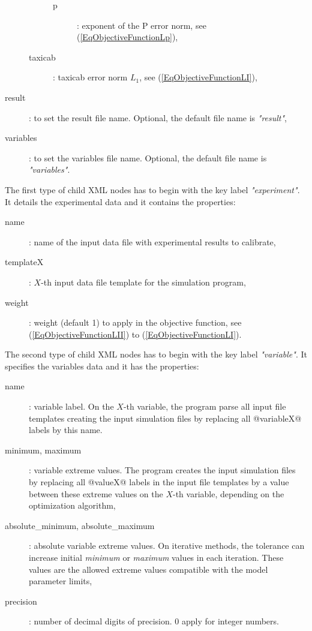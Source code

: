 \documentclass[a4paper]{report}
\begin{document}
\begin{description}
\begin{description}
			\begin{description}
				\item[p]: exponent of the P error norm, see
					(\ref{EqObjectiveFunctionLp}),
			\end{description}
			\item[taxicab]: taxicab error norm $L_1$, see
				(\ref{EqObjectiveFunctionLI}),
		\end{description}
	\item[result]: to set the result file name. Optional, the default file name
		is \emph{"result"},
	\item[variables]: to set the variables file name. Optional, the default file
		name is \emph{"variables"}.
\end{description}

The first type of child XML nodes has to begin with the key label
\emph{"experiment"}. It details the experimental data and it contains the properties:
\begin{description}
	\item[name]: name of the input data file with experimental results to calibrate,
	\item[templateX]: $X$-th input data file template for the simulation program,
	\item[weight]: weight (default 1) to apply in the objective function, see (\ref{EqObjectiveFunctionLII}) to (\ref{EqObjectiveFunctionLI}).
\end{description}

The second type of child XML nodes has to begin with the key label
\emph{"variable"}. It specifies the variables data and it has the properties:
\begin{description}
	\item[name]: variable label. On the $X$-th variable, the program parse all input
file templates creating the input simulation files by replacing all
@variableX@ labels by this name.
\item[minimum, maximum]: variable extreme values. The program creates the input
simulation files by replacing all @valueX@ labels in the input file templates
by a value between these extreme values on the $X$-th variable, depending on the
optimization algorithm,
\item[absolute\_minimum, absolute\_maximum]: absolute variable extreme values.
On iterative methods, the tolerance can increase initial \emph{minimum} or
\emph{maximum} values in each iteration. These values are the allowed extreme values
compatible with the model parameter limits,
\item[precision]: number of decimal digits of precision. 0 apply for integer numbers.
\end{description}
\end{document}

